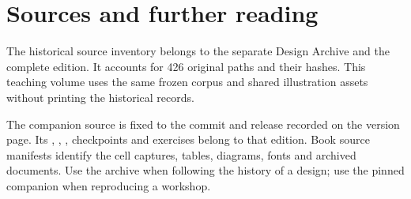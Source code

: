 \clearpage
\setcounter{chapter}{0}
\renewcommand{\thechapter}{P\arabic{chapter}}
\renewcommand{\theHchapter}{provenance.\arabic{chapter}}
\ifBookArchive
%
\else
\chapter{Sources and further reading}

The historical source inventory belongs to the separate Design Archive and the complete edition. It accounts for 426 original paths and their hashes. This teaching volume uses the same frozen corpus and shared illustration assets without printing the historical records.

The companion source is fixed to the commit and release recorded on the version page. Its , , , checkpoints and exercises belong to that edition. Book source manifests identify the cell captures, tables, diagrams, fonts and archived documents. Use the archive when following the history of a design; use the pinned companion when reproducing a workshop.
\fi
